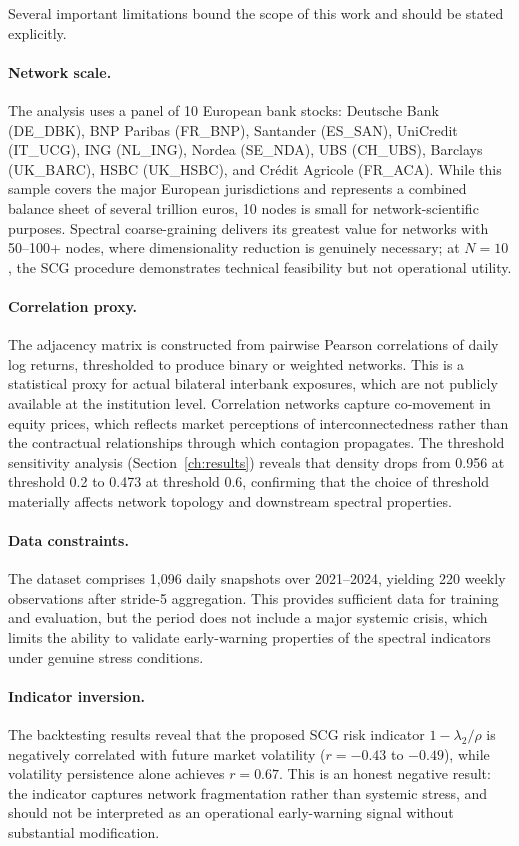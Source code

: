 Several important limitations bound the scope of this work and should be
stated explicitly.

\paragraph{Network scale.}
The analysis uses a panel of 10 European bank stocks: Deutsche Bank
(DE\_DBK), BNP Paribas (FR\_BNP), Santander (ES\_SAN), UniCredit
(IT\_UCG), ING (NL\_ING), Nordea (SE\_NDA), UBS (CH\_UBS), Barclays
(UK\_BARC), HSBC (UK\_HSBC), and Cr\'edit Agricole (FR\_ACA).  While
this sample covers the major European jurisdictions and represents a
combined balance sheet of several trillion euros, 10 nodes is small for
network-scientific purposes.  Spectral coarse-graining delivers its
greatest value for networks with 50--100+ nodes, where dimensionality
reduction is genuinely necessary; at $N=10$, the SCG procedure
demonstrates technical feasibility but not operational utility.

\paragraph{Correlation proxy.}
The adjacency matrix is constructed from pairwise Pearson correlations of
daily log returns, thresholded to produce binary or weighted networks.
This is a statistical proxy for actual bilateral interbank exposures,
which are not publicly available at the institution level.  Correlation
networks capture co-movement in equity prices, which reflects market
perceptions of interconnectedness rather than the contractual
relationships through which contagion propagates.  The threshold
sensitivity analysis (Section~\ref{ch:results}) reveals that density
drops from 0.956 at threshold 0.2 to 0.473 at threshold 0.6, confirming
that the choice of threshold materially affects network topology and
downstream spectral properties.

\paragraph{Data constraints.}
The dataset comprises 1{,}096 daily snapshots over 2021--2024, yielding
220 weekly observations after stride-5 aggregation.  This provides
sufficient data for training and evaluation, but the period does not
include a major systemic crisis, which limits the ability to validate
early-warning properties of the spectral indicators under genuine stress
conditions.

\paragraph{Indicator inversion.}
The backtesting results reveal that the proposed SCG risk indicator
$1 - \lambda_2/\rho$ is negatively correlated with future market
volatility ($r = -0.43$ to $-0.49$), while volatility persistence
alone achieves $r = 0.67$.  This is an honest negative result: the
indicator captures network fragmentation rather than systemic stress,
and should not be interpreted as an operational early-warning signal
without substantial modification.

